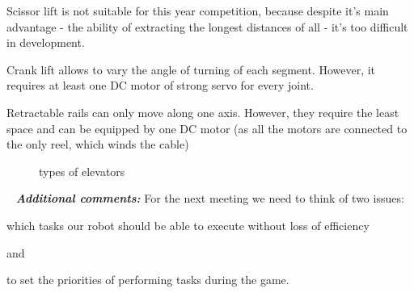 \begin{enumerate*}
		Scissor lift is not suitable for this year competition, because despite it's main advantage - the ability of extracting the longest distances of all - it's too difficult in development.
		
		Crank lift allows to vary the angle of turning of each segment. However, it requires at least one DC motor of strong servo for every joint.
		
		Retractable rails can only move along one axis. However, they require the least space and can be equipped by one DC motor (as all the motors are connected to the only reel, which winds the cable)
		\begin{figure}[H]
			\begin{minipage}[h]{1\linewidth}
				\caption{types of elevators}
			\end{minipage}
		\end{figure}
		
	\end{enumerate*}
	
	 \newline
	\textit{\textbf{Additional comments:}} For the next meeting we need to think of two issues:
	\begin{enumerate*}
		\item which tasks our robot should be able to execute without loss of efficiency
		
		and
		
		\item to set the priorities of performing tasks during the game.
		
	\end{enumerate*}
  


\fillpage
